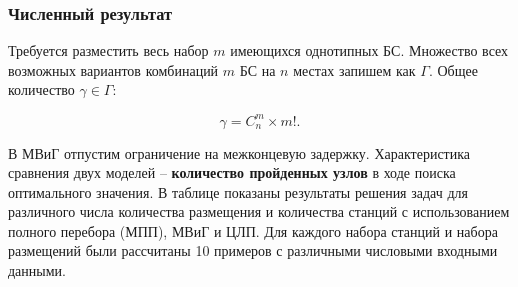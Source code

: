 \begin{frame}
    \frametitle{Численный результат}

    Требуется разместить весь набор $m$ имеющихся однотипных БС. Множество всех возможных вариантов комбинаций $m$ БС на  $n$ местах запишем как $\Gamma$. Общее количество $\gamma \in \Gamma$:
   
    \begin{displaymath}
    \gamma = C_n^m \times m!.
    \end{displaymath} 

    В МВиГ отпустим ограничение на межконцевую задержку.
    \bigskip
    Характеристика сравнения двух моделей --  \textbf{количество пройденных узлов} в ходе поиска оптимального значения.
    \bigskip
    В таблице показаны результаты решения задач для различного числа количества размещения и количества станций с использованием полного перебора (МПП), МВиГ и ЦЛП. Для каждого набора станций и набора размещений были рассчитаны 10 примеров с различными числовыми входными данными. 



\end{frame}


